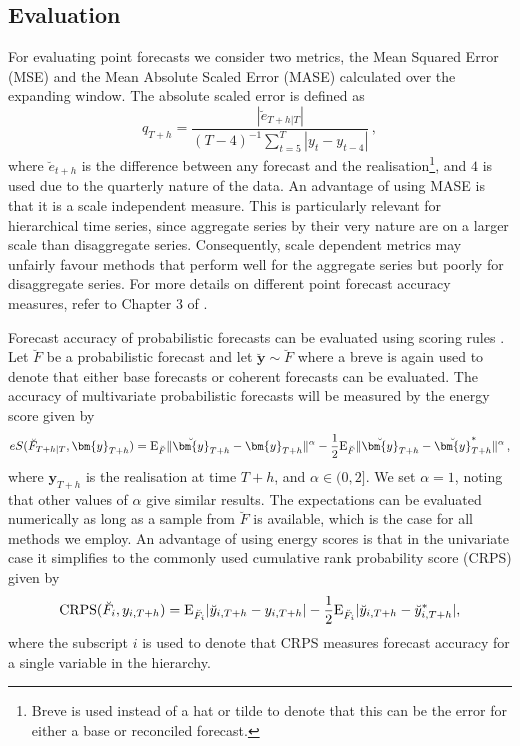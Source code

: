 {\subsection{Evaluation}

For evaluating point forecasts we consider two metrics, the Mean Squared Error (MSE) and the Mean Absolute Scaled Error (MASE) calculated over the expanding window. The absolute scaled error is defined as
\begin{equation*}
	q_{T+h} = \frac{|\breve{e}_{T+h|T}|}{(T-4)^{-1}\sum_{t=5}^{T}|y_t - y_{t-4}|}\,,
\end{equation*}
where $\breve{e}_{t+h}$ is the difference between any forecast and the realisation\footnote{Breve is used instead of a hat or tilde to denote that this can be the error for either a base or reconciled forecast.}, and $4$ is used due to the quarterly nature of the data. An advantage of using MASE is that it is a scale independent measure. This is particularly relevant for hierarchical time series, since aggregate series by their very nature are on a larger scale than disaggregate series. Consequently, scale dependent metrics may unfairly favour methods that perform well for the aggregate series but poorly for disaggregate series. For more details on different point forecast accuracy measures, refer to Chapter 3 of \citet{HynAth2018}.

Forecast accuracy of probabilistic forecasts can be evaluated using scoring rules \citep{Gneiting2014}. Let $\breve{F}$ be a probabilistic forecast and let $\breve{\bm{y}}\sim \breve{F}$ where a breve is again used to denote that either base forecasts or coherent forecasts can be evaluated. The accuracy of multivariate probabilistic forecasts will be measured by the energy score given by
\begin{equation*}
	eS(\breve{F}_{T+h|T},\bm{y}_{T+h}) =
	\E_{\breve{F}}\|\breve{\bm{y}}_{T+h}-\bm{y}_{T+h}\|^\alpha
	-\frac{1}{2}\E_{\breve{F}}\|\breve{\bm{y}}_{T+h}-\breve{\bm{y}}^*_{T+h}\|^\alpha\,,
\end{equation*} where $\bm{y}_{T+h}$ is the realisation at time $T+h$, and $\alpha\in (0,2]$. We set $\alpha=1$, noting that other values of $\alpha$ give similar results. The expectations can be evaluated numerically as long as a sample from $\breve{F}$ is available, which is the case for all methods we employ. An advantage of using energy scores is that in the univariate case it simplifies to the commonly used cumulative rank probability score (CRPS) given by
\begin{equation*}
	\text{CRPS}(\breve{F}_i,y_{i,T+h}) = \text{E}_{\breve{F}_i}|\breve{y}_{i,T+h}-y_{i,T+h}| - \frac{1}{2}\text{E}_{\breve{F}_i}|\breve{y}_{i,T+h}-\breve{y}^*_{i,T+h}|,
\end{equation*}
where the subscript $i$ is used to denote that CRPS measures forecast accuracy for a single variable in the hierarchy.

}
